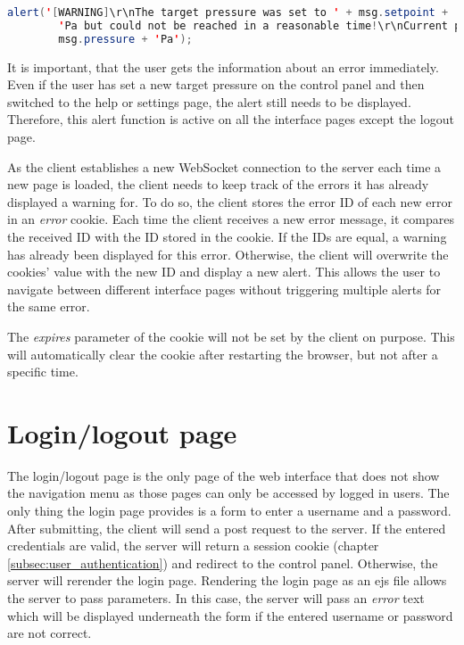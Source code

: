 \begin{lstlisting}[label = lst:log_users, language = Java, numbers = none]
 alert('[WARNING]\r\nThe target pressure was set to ' + msg.setpoint + 
 		'Pa but could not be reached in a reasonable time!\r\nCurrent pressure: ' + 
 		msg.pressure + 'Pa');
\end{lstlisting}

It is important, that the user gets the information about an error immediately. Even if the user has set a new target pressure on the control panel and then switched to the help or settings page, the alert still needs to be displayed. Therefore, this alert function is active on all the interface pages except the logout page.

As the client establishes a new WebSocket connection to the server each time a new page is loaded, the client needs to keep track of the errors it has already displayed a warning for. To do so, the client stores the error ID of each new error in an \textit{error} cookie. Each time the client receives a new error message, it compares the received ID with the ID stored in the cookie. If the IDs are equal, a warning has already been displayed for this error. Otherwise, the client will overwrite the cookies' value with the new ID and display a new alert. This allows the user to navigate between different interface pages without triggering multiple alerts for the same error.

The \textit{expires} parameter of the cookie will not be set by the client on purpose. This will automatically clear the cookie after restarting the browser, but not after a specific time.





\section{Login/logout page}
\label{sec:login_and_logout_page}

The login/logout page is the only page of the web interface that does not show the navigation menu as those pages can only be accessed by logged in users. The only thing the login page provides is a form to enter a username and a password. After submitting, the client will send a post request to the server. If the entered credentials are valid, the server will return a session cookie (chapter \ref{subsec:user_authentication}) and redirect to the control panel. Otherwise, the server will rerender the login page. Rendering the login page as an ejs file allows the server to pass parameters. In this case, the server will pass an \textit{error} text which will be displayed underneath the form if the entered username or password are not correct.





